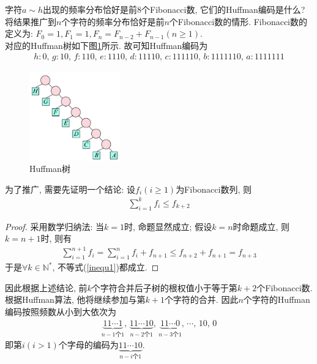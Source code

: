 \documentclass{article}
\begin{document}
\pagebreak

\begin{homeworkProblem}
	字符$a\sim h$出现的频率分布恰好是前8个Fibonacci数, 它们的Huffman编码是什么? 将结果推广到$n$个字符的频率分布恰好是前$n$个Fibonacci数的情形. Fibonacci数的定义为: $F_0=1,F_1=1,F_n=F_{n-2}+F_{n-1}(n\geq 1)$.
	\\
	
	\solution 对应的Huffman树如下图\ref{fig:Huffman树}所示. 故可知Huffman编码为
	\begin{align}
		h:0,\,g:10,\,f:110,\,e:1110,\,d:11110,\,c:111110,\,b:1111110,\,a:1111111
	\end{align}
	\begin{figure}[H]  %
		\centering
		\includegraphics[width=0.35\textwidth]{images/title/Huffman树.pdf}
		\caption{Huffman树}
		\label{fig:Huffman树}
	\end{figure}
	为了推广, 需要先证明一个结论: 设$f_i(i\geq 1)$为Fibonacci数列, 则
	\begin{align}
		\sum_{i=1}^k{f_i}\le f_{k+2} \label{inequ1}
	\end{align}
	\begin{proof}
		采用数学归纳法: 当$k=1$时, 命题显然成立; 假设$k=n$时命题成立, 则$k=n+1$时, 则有
		\begin{align}
			\sum_{i=1}^{n+1}{f_i}=\sum_{i=1}^n{f_i}+f_{n+1}\le f_{n+2}+f_{n+1}=f_{n+3}
		\end{align}
		于是$\forall k\in \mathbb{N}^{\ast}$, 不等式(\ref{inequ1})都成立.
	\end{proof}
	因此根据上述结论, 前$k$个字符合并后子树的根权值小于等于第$k+2$个Fibonacci数. 根据Huffman算法, 他将继续参加与第$k+1$个字符的合并. 因此$n$个字符的Huffman编码按照频数从小到大依次为
	\begin{align}
		\underset{n-1\text{个}1}{\underbrace{11\cdots 1}},\, \underset{n-2\text{个}1}{\underbrace{11\cdots 10}}, \, \underset{n-3\text{个}1}{\underbrace{11\cdots 0}}, \, \cdots , \, 10,\, 0
	\end{align}
	即第$i(i>1)$个字母的编码为$\underset{n-i\text{个}1}{\underbrace{11\cdots 10}}$.
\end{homeworkProblem}
\end{document}
